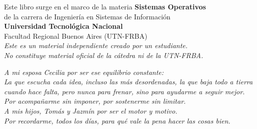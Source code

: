 \vspace{1cm}


\vspace{0.8cm}


\vspace{0.8cm}


\newpage
\thispagestyle{empty}
\vspace*{3cm}

\begin{center}
  {\small
  Este libro surge en el marco de la materia \textbf{Sistemas Operativos}\\
  de la carrera de Ingeniería en Sistemas de Información\\[0.4em]
  \textbf{Universidad Tecnológica Nacional}\\
  Facultad Regional Buenos Aires (UTN-FRBA)\\[1.5cm]
  \textit{Este es un material independiente creado por un estudiante.\\
  No constituye material oficial de la cátedra ni de la UTN-FRBA.}
  }
\end{center}

\newpage
\thispagestyle{empty}
\vspace*{5cm}

\begin{center}
  \textit{A mi esposa Cecilia por ser ese equilibrio constante:}\\
  \textit{La que escucha cada idea, incluso las más desordenadas, la que baja todo a tierra cuando hace falta, pero nunca para frenar, sino para ayudarme a seguir mejor.}\\
  \textit{Por acompañarme sin imponer, por sostenerme sin limitar.}\\[0.5em]
  \textit{A mis hijos, Tomás y Jazmín por ser el motor y motivo.}\\
  \textit{Por recordarme, todos los días, para qué vale la pena hacer las cosas bien.}
\end{center}

